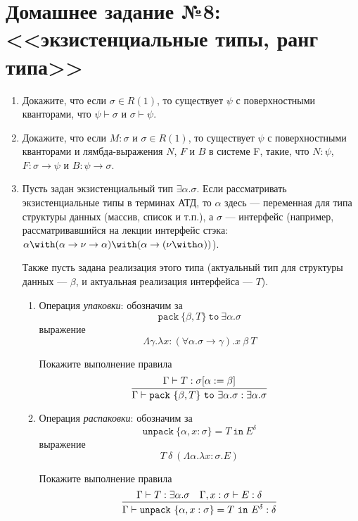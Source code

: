 \documentclass[10pt,a4paper,oneside]{article}
\begin{document}
\section*{Домашнее задание №8: <<экзистенциальные типы, ранг типа>>}

\begin{CJK}{UTF8}{min}
\begin{enumerate}

\item Докажите, что если $\sigma \in R(1)$, то существует $\psi$ с поверхностными кванторами, что
$\psi \vdash \sigma$ и $\sigma \vdash \psi$.

\item Докажите, что если $M:\sigma$ и $\sigma \in R(1)$, то существует $\psi$ с поверхностными
кванторами и лямбда-выражения $N$, $F$ и $B$ в системе F, такие, что $N:\psi$, 
$F:\sigma\rightarrow\psi$ и $B:\psi\rightarrow\sigma$.

\item Пусть задан экзистенциальный тип $\exists\alpha.\sigma$. Если рассматривать экзистенциальные
типы в терминах АТД, то $\alpha$ здесь --- переменная для типа структуры данных (массив, список и т.п.),
а $\sigma$ --- интерфейс (например, рассматривавшийся на лекции интерфейс стэка: 
$\alpha \with (\alpha\rightarrow\nu\rightarrow\alpha) \with (\alpha\rightarrow(\nu\with\alpha))$).

Также пусть задана реализация этого типа (актуальный тип для структуры данных --- $\beta$, и
актуальная реализация интерфейса --- $T$).

\begin{enumerate}
\item 
Операция \emph{упаковки}: обозначим за $$\texttt{pack}\ \{\beta,T\}\ \texttt{to}\ \exists\alpha.\sigma$$ выражение 
$$\Lambda \gamma.\lambda x: (\forall \alpha. \sigma\rightarrow\gamma).x\ \beta\ T$$

Покажите выполнение правила
$$\infer{\Gamma\vdash\texttt{pack}\ \{\beta,T\}\ \texttt{to}\ \exists\alpha.\sigma : \exists\alpha.\sigma}
{\Gamma\vdash T : \sigma[\alpha := \beta]}$$

\item Операция \emph{распаковки}: обозначим за $$\texttt{unpack}\ \{\alpha,x:\sigma\} = T\ \texttt{in}\ E^\delta$$ выражение
$$T\ \delta\ (\Lambda \alpha.\lambda x: \sigma.E)$$

Покажите выполнение правила
$$\infer{\Gamma\vdash \texttt{unpack}\ \{\alpha,x:\sigma\} = T\ \texttt{in}\ E^\delta: \delta}
{\Gamma\vdash T : \exists\alpha.\sigma \quad \Gamma,x:\sigma \vdash E : \delta}$$


\end{enumerate}
\end{enumerate}
\end{CJK}
\end{document}
